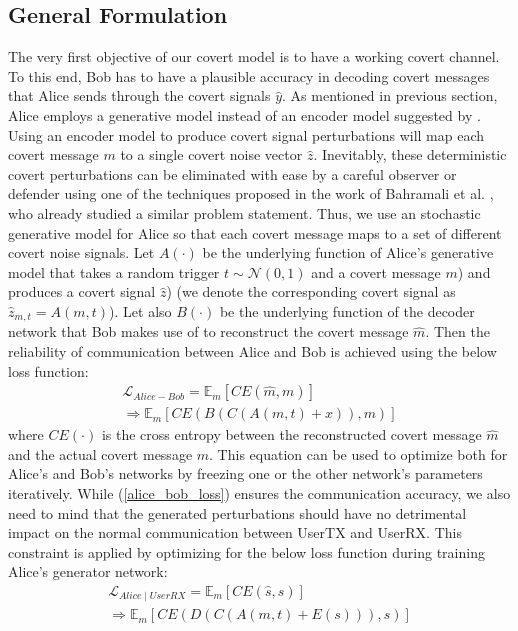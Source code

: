 \subsection{General Formulation}
The very first objective of our covert model is to have a working covert channel. To this end, Bob has to have a plausible accuracy in decoding covert messages that Alice sends through the covert signals \(\hat{y}\). As mentioned in previous section, Alice employs a generative model instead of an encoder model suggested by \cite{mohammed2021adversarial}. Using an encoder model to produce covert signal perturbations will map each covert message \(m\) to a single covert noise vector \(\hat{z}\). Inevitably, these deterministic covert perturbations can be eliminated with ease by a careful observer or defender using one of the techniques proposed in the work of Bahramali et al. \cite{bahramali2021robust}, who already studied a similar problem statement. Thus, we use an stochastic generative model for Alice so that each covert message maps to a set of different covert noise signals. Let \(A(\cdot)\) be the underlying function of Alice's generative model that takes a random trigger \(t \sim \mathcal{N}(0, 1)\) and a covert message \(m\)) and produces a covert signal \(\hat{z}\)) (we denote the corresponding covert signal as \(\hat{z}_{m, t} = A(m, t)\)). Let also  \(B(\cdot)\) be the underlying function of the decoder network that Bob makes use of to reconstruct the covert message \(\hat{m}\). Then the reliability of communication between Alice and Bob is achieved using the below loss function:
\begin{equation}
	\begin{array}{l} \label{alice_bob_loss}
	\mathcal{L}_{Alice-Bob} = \mathbb{E}_{m}[CE(\hat{m}, m)] \\ \Rightarrow \mathbb{E}_{m}[CE(B(C(A(m, t) + x)), m)]
	\end{array}
\end{equation}
where \(CE(\cdot)\) is the cross entropy between the reconstructed covert message \(\hat{m}\) and the actual covert message \(m\). This equation can be used to optimize both for Alice's and Bob's networks by freezing one or the other network's parameters iteratively. While (\ref{alice_bob_loss}) ensures the communication accuracy, we also need to mind that the generated perturbations should have no detrimental impact on the normal communication between UserTX and UserRX. This constraint is applied by optimizing for the below loss function during training Alice's generator network:
\begin{equation}
	\begin{array}{l}
	\mathcal{L}_{Alice \mid UserRX} = \mathbb{E}_{m}[CE(\hat{s}, s)] \\ \Rightarrow \mathbb{E}_{m}[CE(D(C(A(m, t) + E(s))), s)]
	\end{array}
\end{equation}
